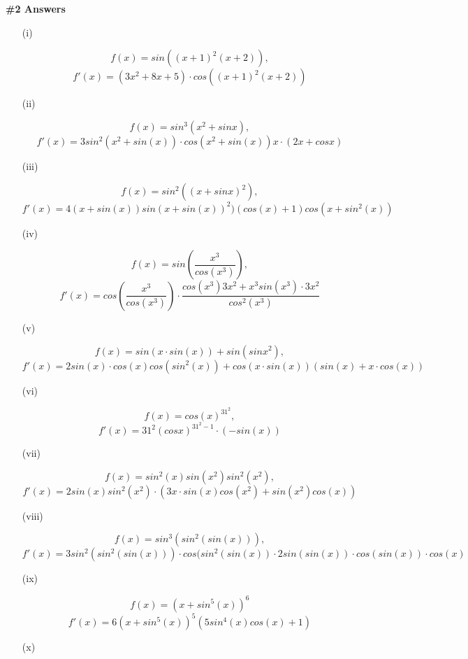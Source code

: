 \documentclass[a4paper,12pt]{report}
\begin{document}
\noindent
\textbf{\#2 Answers}
\begin{enumerate}
\item[(i)] 
\begin{sloppypar}
\[f(x)=sin((x+1)^2(x+2)),\]\[ f'(x)=(3x^2+8x+5)\cdot{cos((x+1)^2(x+2))}\]
\end{sloppypar}
\item[(ii)] 
\begin{sloppypar}
\[f(x)=sin^3(x^2+sinx), \]\[f'(x)=3sin^2(x^2+sin(x))\cdot{cos(x^2+sin(x))x}\cdot{(2x+cosx)}\]
\end{sloppypar} 
\item[(iii)] 
\begin{sloppypar}
\[f(x)=sin^2((x+sinx)^2),\]\[ f'(x)=4(x+sin(x))sin(x+sin(x))^2)(cos(x)+1)cos(x+sin^2(x))\]
\end{sloppypar} 
\item[(iv)]
\begin{sloppypar}
\[f(x)=sin(\frac{x^3}{cos(x^3)}), \]\[f'(x)=cos(\frac{x^3}{cos(x^3)})\cdot{\frac{cos(x^3)3x^2+x^3sin(x^3)\cdot{3x^2}}{cos^2(x^3)}}\]
\end{sloppypar} 
\item[(v)]
\begin{sloppypar}
\[f(x)=sin(x\cdot{sin(x)})+sin(sinx^2),\]\[ f'(x)=2sin(x)\cdot{cos(x)}cos(sin^2(x))+cos(x\cdot{sin(x)})(sin(x)+x\cdot{cos(x)})\]
\end{sloppypar} 
\item[(vi)] 
\begin{sloppypar}
\[f(x)=cos(x)^{31^2},\]\[ f'(x)=31^2(cosx)^{31^2-1}\cdot{(-sin(x))}\]
\end{sloppypar}
\item[(vii)] 
\begin{sloppypar}
\[f(x)=sin^2(x)sin(x^2)sin^2(x^2),\]
 \[f'(x)=2sin(x)sin^2(x^2)\cdot{(3x\cdot{sin(x)}cos(x^2)+sin(x^2)cos(x))}\]
\end{sloppypar}
\item[(viii)]
\begin{sloppypar}
\[f(x)=sin^3(sin^2(sin(x))),\] 
\[f'(x)=3sin^2(sin^2(sin(x)))\cdot{cos(sin^2(sin(x))
\cdot{2sin(sin(x))\cdot{cos(sin(x))\cdot{cos(x)}}}}\]
\end{sloppypar} 
\item[(ix)] 
\begin{sloppypar}
\[f(x)=(x+sin^5(x))^6\] \[f'(x)=6(x+sin^5(x))^5(5sin^4(x)cos(x)+1)\]
\end{sloppypar}
\item[(x)] 
\begin{sloppypar}

\end{sloppypar}
\end{enumerate}
\end{document}
